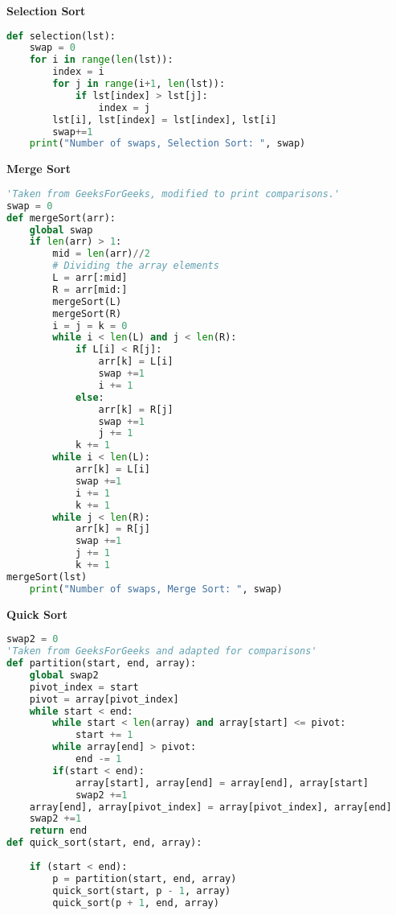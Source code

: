 \documentclass[a4paper]{exam}
\begin{document}
\begin{questions}
\begin{solution}
   \textbf{Selection Sort}
   \begin{lstlisting}[language=Python, caption=Selection Sort with Comparisons]
def selection(lst):
    swap = 0
    for i in range(len(lst)):
        index = i
        for j in range(i+1, len(lst)):
            if lst[index] > lst[j]:
                index = j
        lst[i], lst[index] = lst[index], lst[i]
        swap+=1
    print("Number of swaps, Selection Sort: ", swap)
   \end{lstlisting}
   \textbf{Merge Sort}
      \begin{lstlisting}[language=Python, caption=Merge Sort with Comparisons]
'Taken from GeeksForGeeks, modified to print comparisons.'
swap = 0
def mergeSort(arr):
    global swap
    if len(arr) > 1:
        mid = len(arr)//2
        # Dividing the array elements
        L = arr[:mid]
        R = arr[mid:]
        mergeSort(L)
        mergeSort(R)
        i = j = k = 0
        while i < len(L) and j < len(R):
            if L[i] < R[j]:
                arr[k] = L[i]
                swap +=1
                i += 1
            else:
                arr[k] = R[j]
                swap +=1
                j += 1
            k += 1
        while i < len(L):
            arr[k] = L[i]
            swap +=1
            i += 1
            k += 1
        while j < len(R):
            arr[k] = R[j]
            swap +=1
            j += 1
            k += 1
mergeSort(lst)
    print("Number of swaps, Merge Sort: ", swap)
   \end{lstlisting}
   \textbf{Quick Sort}
      \begin{lstlisting}[language=Python, caption=Quick Sort with Comparisons]
swap2 = 0
'Taken from GeeksForGeeks and adapted for comparisons'
def partition(start, end, array):
    global swap2
    pivot_index = start
    pivot = array[pivot_index]
    while start < end:
        while start < len(array) and array[start] <= pivot:
            start += 1
        while array[end] > pivot:
            end -= 1
        if(start < end):
            array[start], array[end] = array[end], array[start]
            swap2 +=1
    array[end], array[pivot_index] = array[pivot_index], array[end]
    swap2 +=1
    return end
def quick_sort(start, end, array):
     
    if (start < end):
        p = partition(start, end, array)
        quick_sort(start, p - 1, array)
        quick_sort(p + 1, end, array)

   \end{lstlisting}
   

\end{solution}
\end{questions}
\end{document}
